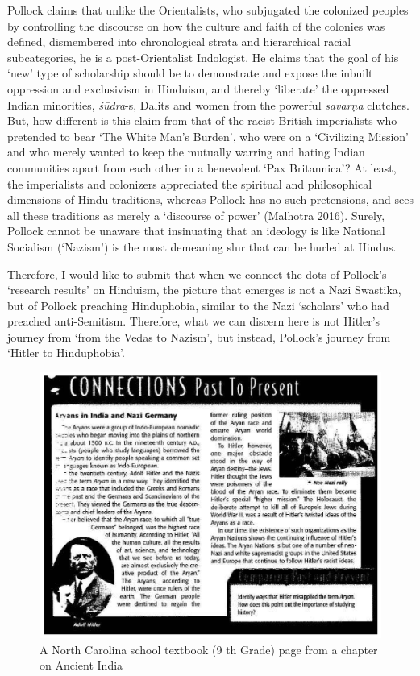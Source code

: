 Pollock claims that unlike the Orientalists, who subjugated the colonized peoples by controlling the discourse on how the culture and faith of the colonies was defined, dismembered into chronological strata and hierarchical racial subcategories, he is a post-Orientalist Indologist. He claims that the goal of his ‘new’ type of scholarship should be to demonstrate and expose the inbuilt oppression and exclusivism in Hinduism, and thereby ‘liberate’ the oppressed Indian minorities, \textit{śūdra}-s, Dalits and women from the powerful \textit{savarṇa} clutches. But, how different is this claim from that of the racist British imperialists who pretended to bear ‘The White Man’s Burden’, who were on a ‘Civilizing Mission’ and who merely wanted to keep the mutually warring and hating Indian communities apart from each other in a benevolent ‘Pax Britannica’? At least, the imperialists and colonizers appreciated the spiritual and philosophical dimensions of Hindu traditions, whereas Pollock has no such pretensions, and sees all these traditions as merely a ‘discourse of power’ (Malhotra 2016). Surely, Pollock cannot be unaware that insinuating that an ideology is like National Socialism (‘Nazism’) is the most demeaning slur that can be hurled at Hindus.

Therefore, I would like to submit that when we connect the dots of Pollock’s ‘research results’ on Hinduism, the picture that emerges is not a Nazi Swastika, but of Pollock preaching Hinduphobia, similar to the Nazi ‘scholars’ who had preached anti-Semitism. Therefore, what we can discern here is not Hitler’s journey from ‘from the Vedas to Nazism’, but instead, Pollock’s journey from ‘Hitler to Hinduphobia’.

\begin{figure}[!h]
\includegraphics[scale=.21]{images/chap8-1.jpg}
\caption{A North Carolina school textbook (9 th Grade) page from a chapter on Ancient India}\label{chap8-fig1}
\end{figure}


